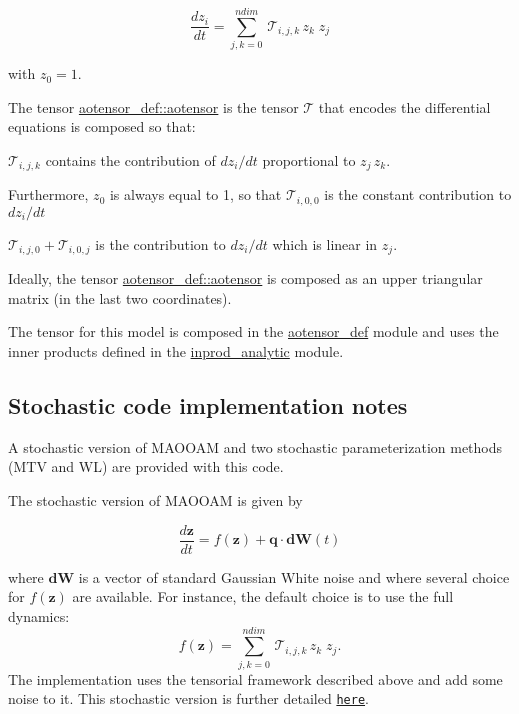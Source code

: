 \[ \frac{d z_i}{dt} = \sum_{j,k=0}^{ndim} \, \mathcal{T}_{i,j,k} \, z_k \; z_j \]

with $z_0 = 1$.

The tensor \hyperlink{namespaceaotensor__def_a0dc43bc9294a18f2fe57b67489f1702f}{aotensor\+\_\+def\+::aotensor} is the tensor $\mathcal{T}$ that encodes the differential equations is composed so that\+:


\begin{DoxyItemize}
\item $\mathcal{T}_{i,j,k}$ contains the contribution of $dz_i/dt$ proportional to $ z_j \, z_k$.
\item Furthermore, $z_0$ is always equal to 1, so that $\mathcal{T}_{i,0,0}$ is the constant contribution to $dz_i/dt$
\item $\mathcal{T}_{i,j,0} + \mathcal{T}_{i,0,j}$ is the contribution to $dz_i/dt$ which is linear in $z_j$.
\end{DoxyItemize}

Ideally, the tensor \hyperlink{namespaceaotensor__def_a0dc43bc9294a18f2fe57b67489f1702f}{aotensor\+\_\+def\+::aotensor} is composed as an upper triangular matrix (in the last two coordinates).

The tensor for this model is composed in the \hyperlink{namespaceaotensor__def}{aotensor\+\_\+def} module and uses the inner products defined in the \hyperlink{namespaceinprod__analytic}{inprod\+\_\+analytic} module. 



\subsection*{Stochastic code implementation notes}

A stochastic version of M\+A\+O\+O\+AM and two stochastic parameterization methods (M\+TV and WL) are provided with this code.

The stochastic version of M\+A\+O\+O\+AM is given by

\[ \frac{d \boldsymbol{z}}{dt} = f(\boldsymbol{z})+ \boldsymbol{q} \cdot \boldsymbol{dW} (t)\]

where $\boldsymbol{dW}$ is a vector of standard Gaussian White noise and where several choice for $f(\boldsymbol{z})$ are available. For instance, the default choice is to use the full dynamics\+: \[ f(\boldsymbol{z}) = \sum_{j,k=0}^{ndim} \, \mathcal{T}_{i,j,k} \, z_k \; z_j . \] The implementation uses the tensorial framework described above and add some noise to it. This stochastic version is further detailed \href{md_sto_doc.html}{\tt here}.

